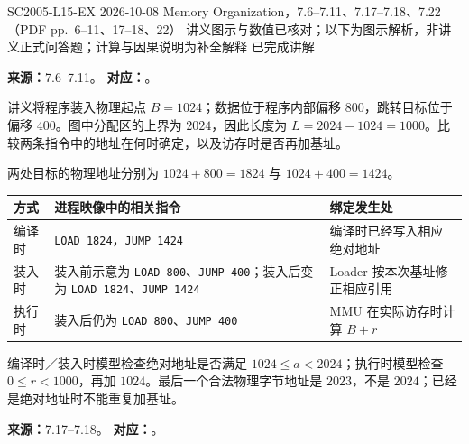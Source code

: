 

\examplemeta
  {SC2005-L15-EX}
  {2026-10-08}
  {Memory Organization，7.6--7.11、7.17--7.18、7.22（PDF pp.~6--11、17--18、22）}
  {讲义图示与数值已核对；以下为图示解析，非讲义正式问答题；计算与因果说明为补全解释}
  {已完成讲解}


\textbf{来源：}7.6--7.11。\quad
\textbf{对应：}。

讲义将程序装入物理起点 $B=1024$；数据位于程序内部偏移 $800$，跳转目标位于偏移 $400$。图中分配区的上界为 $2024$，因此长度为 $L=2024-1024=1000$。比较两条指令中的地址在何时确定，以及访存时是否再加基址。

\begin{checkedsolution}
两处目标的物理地址分别为 $1024+800=1824$ 与 $1024+400=1424$。
\begin{center}
\begin{tabularx}{\textwidth}{@{}>{\raggedright\arraybackslash}p{2.3cm}>{\raggedright\arraybackslash}X>{\raggedright\arraybackslash}X@{}}
\toprule
方式 & 进程映像中的相关指令 & 绑定发生处 \\
\midrule
编译时 & \texttt{LOAD 1824}，\texttt{JUMP 1424} & 编译时已经写入相应绝对地址 \\
装入时 & 装入前示意为 \texttt{LOAD 800}、\texttt{JUMP 400}；装入后变为 \texttt{LOAD 1824}、\texttt{JUMP 1424} & Loader 按本次基址修正相应引用 \\
执行时 & 装入后仍为 \texttt{LOAD 800}、\texttt{JUMP 400} & MMU 在实际访存时计算 $B+r$ \\
\bottomrule
\end{tabularx}
\end{center}
编译时／装入时模型检查绝对地址是否满足 $1024\le a<2024$；执行时模型检查 $0\le r<1000$，再加 $1024$。最后一个合法物理字节地址是 $2023$，不是 $2024$；已经是绝对地址时不能重复加基址。
\end{checkedsolution}


\textbf{来源：}7.17--7.18。\quad
\textbf{对应：}。

